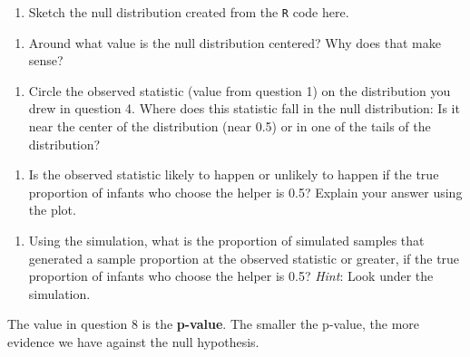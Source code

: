 \documentclass[
]{report}
\providecommand{\tightlist}{%
  \setlength{\itemsep}{0pt}\setlength{\parskip}{0pt}}
\begin{document}
\begin{enumerate}
\def\labelenumi{\arabic{enumi}.}
\setcounter{enumi}{3}
\tightlist
\item
  Sketch the null distribution created from the \texttt{R} code here.
\end{enumerate}

\vspace{1.8in}

\begin{enumerate}
\def\labelenumi{\arabic{enumi}.}
\setcounter{enumi}{4}
\tightlist
\item
  Around what value is the null distribution centered? Why does that make sense?
\end{enumerate}

\vspace{1in}

\begin{enumerate}
\def\labelenumi{\arabic{enumi}.}
\setcounter{enumi}{5}
\tightlist
\item
  Circle the observed statistic (value from question 1) on the distribution you drew in question 4. Where does this statistic fall in the null distribution: Is it near the center of the distribution (near 0.5) or in one of the tails of the distribution?
\end{enumerate}

\vspace{1in}

\begin{enumerate}
\def\labelenumi{\arabic{enumi}.}
\setcounter{enumi}{6}
\tightlist
\item
  Is the observed statistic likely to happen or unlikely to happen if the true proportion of infants who choose the helper is 0.5? Explain your answer using the plot.
\end{enumerate}

\newpage

\begin{enumerate}
\def\labelenumi{\arabic{enumi}.}
\setcounter{enumi}{7}
\tightlist
\item
  Using the simulation, what is the proportion of simulated samples that generated a sample proportion at the observed statistic or greater, if the true proportion of infants who choose the helper is 0.5? \emph{Hint}: Look under the simulation.
\end{enumerate}

\vspace{1in}

The value in question 8 is the \textbf{p-value}. The smaller the p-value, the more evidence we have against the null hypothesis.
\end{document}
